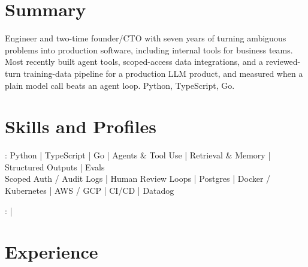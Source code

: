 \documentclass[print]{jack-resume}
\begin{document}
\pagecolor{darkmodeBackground}


\begin{minipage}[t][1cm][t]{.03\textwidth}
    \hfill
\end{minipage}

\section{Summary}
Engineer and two-time founder/CTO with seven years of turning ambiguous problems into production software, including internal tools for business teams. Most recently built agent tools, scoped-access data integrations, and a reviewed-turn training-data pipeline for a production LLM product, and measured when a plain model call beats an agent loop. Python, TypeScript, Go.
\sectionsep

\section{Skills and Profiles}
:
Python \hfill | \hfill
TypeScript \hfill | \hfill
Go \hfill | \hfill
Agents \& Tool Use \hfill | \hfill
Retrieval \& Memory \hfill | \hfill
Structured Outputs \hfill | \hfill
Evals \\
\hspace{1.0cm} Scoped Auth / Audit Logs \hfill | \hfill
Human Review Loops \hfill | \hfill
Postgres \hfill | \hfill
Docker / Kubernetes \hfill | \hfill
AWS / GCP \hfill | \hfill
CI/CD \hfill | \hfill
Datadog \\

\raggedright{
    :
      \href{https://www.linkedin.com/in/jack-sturtevant/}{ \ExternalLink} |
     \href{https://github.com/jacksturt}{ \ExternalLink}}

\section{Experience}
\end{document}
